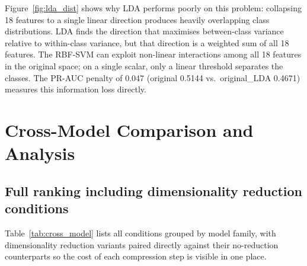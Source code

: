 \documentclass[12pt,a4paper]{article}
\begin{document}
Figure~\ref{fig:lda_dist} shows why LDA performs poorly on this problem:
collapsing 18 features to a single linear direction produces heavily
overlapping class distributions. LDA finds the direction that maximises
between-class variance relative to within-class variance, but that direction
is a weighted sum of all 18 features. The RBF-SVM can exploit non-linear
interactions among all 18 features in the original space; on a single scalar,
only a linear threshold separates the classes. The PR-AUC penalty of
0.047 (original 0.5144 vs.\ original\_LDA 0.4671) measures this information
loss directly.

\section{Cross-Model Comparison and Analysis}

\subsection{Full ranking including dimensionality reduction conditions}

Table~\ref{tab:cross_model} lists all conditions grouped by model family,
with dimensionality reduction variants paired directly against their
no-reduction counterparts so the cost of each compression step is visible
in one place.
\end{document}
